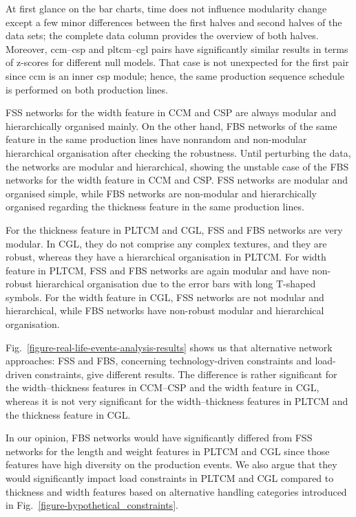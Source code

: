 At first glance on the bar charts, time does not influence modularity change except a few minor differences between the first halves and second halves of the data sets; the complete data column provides the overview of both halves. Moreover, \acs{ccm}--\acs{csp} and \acs{pltcm}--\acs{cgl} pairs have significantly similar results in terms of z-scores for different null models. That case is not unexpected for the first pair since \acs{ccm} is an inner \acs{csp} module; hence, the same production sequence schedule is performed on both production lines.

FSS networks for the width feature in CCM and CSP are always modular and hierarchically organised mainly. On the other hand, FBS networks of the same feature in the same production lines have nonrandom and non-modular hierarchical organisation after checking the robustness. Until perturbing the data, the networks are modular and hierarchical, showing the unstable case of the FBS networks for the width feature in CCM and CSP. FSS networks are modular and organised simple, while FBS networks are non-modular and hierarchically organised regarding the thickness feature in the same production lines. 

For the thickness feature in PLTCM and CGL, FSS and FBS networks are very modular. In CGL, they do not comprise any complex textures, and they are robust, whereas they have a hierarchical organisation in PLTCM. For width feature in PLTCM, FSS and FBS networks are again modular and have non-robust hierarchical organisation due to the error bars with long T-shaped symbols. For the width feature in CGL, FSS networks are not modular and hierarchical, while FBS networks have non-robust modular and hierarchical organisation.

Fig.~\ref{figure-real-life-events-analysis-results} shows us that alternative network approaches: FSS and FBS, concerning technology-driven constraints and load-driven constraints, give different results. The difference is rather significant for the width--thickness features in CCM--CSP and the width feature in CGL, whereas it is not very significant for the width--thickness features in PLTCM and the thickness feature in CGL.

In our opinion, FBS networks would have significantly differed from FSS networks for the length and weight features in PLTCM and CGL since those features have high diversity on the production events. We also argue that they would significantly impact load constraints in PLTCM and CGL compared to thickness and width features based on alternative handling categories introduced in Fig.~\ref{figure-hypothetical_constraints}.
\clearpage

